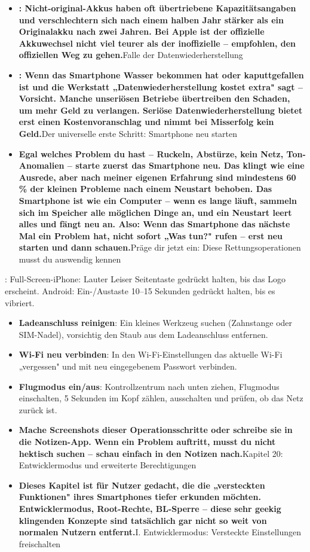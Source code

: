 \begin{itemize}
  \item \textbf{: Nicht-original-Akkus haben oft übertriebene Kapazitätsangaben und verschlechtern sich nach einem halben Jahr stärker als ein Originalakku nach zwei Jahren. Bei Apple ist der offizielle Akkuwechsel nicht viel teurer als der inoffizielle – empfohlen, den offiziellen Weg zu gehen.}Falle der Datenwiederherstellung
  \item \textbf{: Wenn das Smartphone Wasser bekommen hat oder kaputtgefallen ist und die Werkstatt „Datenwiederherstellung kostet extra" sagt – Vorsicht. Manche unseriösen Betriebe übertreiben den Schaden, um mehr Geld zu verlangen. Seriöse Datenwiederherstellung bietet erst einen Kostenvoranschlag und nimmt bei Misserfolg kein Geld.}Der universelle erste Schritt: Smartphone neu starten
  \item \textbf{Egal welches Problem du hast – Ruckeln, Abstürze, kein Netz, Ton-Anomalien – starte zuerst das Smartphone neu. Das klingt wie eine Ausrede, aber nach meiner eigenen Erfahrung sind mindestens 60 \% der kleinen Probleme nach einem Neustart behoben. Das Smartphone ist wie ein Computer – wenn es lange läuft, sammeln sich im Speicher alle möglichen Dinge an, und ein Neustart leert alles und fängt neu an. Also: Wenn das Smartphone das nächste Mal ein Problem hat, nicht sofort „Was tun?" rufen – erst neu starten und dann schauen.}Präge dir jetzt ein: Diese Rettungsoperationen musst du auswendig kennen
\end{itemize}


: Full-Screen-iPhone: Lauter Leiser Seitentaste gedrückt halten, bis das Logo erscheint. Android: Ein-/Austaste 10–15 Sekunden gedrückt halten, bis es vibriert.

\begin{itemize}
  \item \textbf{Ladeanschluss reinigen}: Ein kleines Werkzeug suchen (Zahnstange oder SIM-Nadel), vorsichtig den Staub aus dem Ladeanschluss entfernen.
  \item \textbf{Wi-Fi neu verbinden}: In den Wi-Fi-Einstellungen das aktuelle Wi-Fi „vergessen" und mit neu eingegebenem Passwort verbinden.
  \item \textbf{Flugmodus ein/aus}: Kontrollzentrum nach unten ziehen, Flugmodus einschalten, 5 Sekunden im Kopf zählen, ausschalten und prüfen, ob das Netz zurück ist.
  \item \textbf{Mache Screenshots dieser Operationsschritte oder schreibe sie in die Notizen-App. Wenn ein Problem auftritt, musst du nicht hektisch suchen – schau einfach in den Notizen nach.}Kapitel 20: Entwicklermodus und erweiterte Berechtigungen
  \item \textbf{Dieses Kapitel ist für Nutzer gedacht, die die „versteckten Funktionen" ihres Smartphones tiefer erkunden möchten. Entwicklermodus, Root-Rechte, BL-Sperre – diese sehr geekig klingenden Konzepte sind tatsächlich gar nicht so weit von normalen Nutzern entfernt.}I. Entwicklermodus: Versteckte Einstellungen freischalten
\end{itemize}

